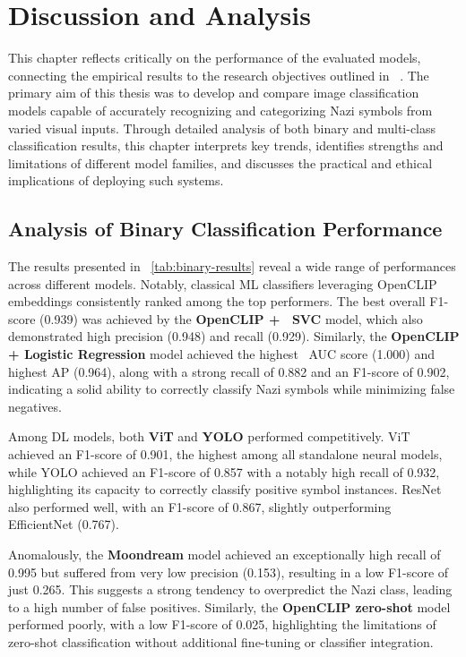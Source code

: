 
\chapter{Discussion and Analysis}\label{chapter:discussion-and-analysis}

This chapter reflects critically on the performance of the evaluated models, connecting the empirical results to the
research objectives outlined in ~. The primary aim of this thesis was to develop
and compare image classification models capable of accurately recognizing and categorizing Nazi symbols from varied
visual inputs. Through detailed analysis of both binary and multi-class classification results, this chapter
interprets key trends, identifies strengths and limitations of different model families, and discusses the practical
and ethical implications of deploying such systems.

\section{Analysis of Binary Classification Performance}

The results presented in ~\autoref{tab:binary-results} reveal a wide range of performances across different models.
Notably, classical \ac{ML} classifiers leveraging OpenCLIP embeddings consistently ranked among the top
performers. The best overall F1-score (0.939) was achieved by the \textbf{OpenCLIP + ~\ac{SVC}} model, which also
demonstrated high precision (0.948) and recall (0.929). Similarly, the \textbf{OpenCLIP + Logistic Regression}
model achieved the highest ~\ac{AUC} score (1.000) and highest \ac{AP} (0.964), along with a strong recall of 0.882
and an F1-score of 0.902, indicating a solid ability to correctly classify Nazi symbols while minimizing false
negatives.

Among \ac{DL} models, both \textbf{\ac{ViT}} and \textbf{\ac{YOLO}} performed competitively. \ac{ViT} achieved an
F1-score of 0.901, the highest among all standalone neural models, while \ac{YOLO} achieved an F1-score of 0.857 with
a notably high recall of 0.932, highlighting its capacity to correctly classify positive symbol instances.
\ac{ResNet} also performed well, with an F1-score of 0.867, slightly outperforming EfficientNet (0.767).

Anomalously, the \textbf{Moondream} model achieved an exceptionally high recall of 0.995 but suffered from very low
precision (0.153), resulting in a low F1-score of just 0.265. This suggests a strong tendency to overpredict the
Nazi class, leading to a high number of false positives. Similarly, the \textbf{OpenCLIP zero-shot} model performed
poorly, with a low F1-score of 0.025, highlighting the limitations of zero-shot classification without additional
fine-tuning or classifier integration.

